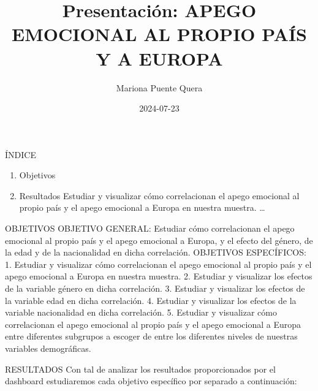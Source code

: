 \documentclass[
  ignorenonframetext,
]{beamer}
\title{Presentación: APEGO EMOCIONAL AL PROPIO PAÍS Y A EUROPA}
\author{Mariona Puente Quera}
\date{2024-07-23}
\providecommand{\tightlist}{%
  \setlength{\itemsep}{0pt}\setlength{\parskip}{0pt}}
\begin{document}
\frame{\titlepage}

\begin{frame}{ÍNDICE}
\label{uxedndice}
\begin{enumerate}
\tightlist
\item
  Objetivos
\item
  Resultados Estudiar y visualizar cómo correlacionan el apego emocional
  al propio país y el apego emocional a Europa en nuestra muestra.
  \ldots{}
\end{enumerate}
\end{frame}

\begin{frame}{OBJETIVOS}
\label{objetivos}
OBJETIVO GENERAL: Estudiar cómo correlacionan el apego emocional al
propio país y el apego emocional a Europa, y el efecto del género, de la
edad y de la nacionalidad en dicha correlación. OBJETIVOS ESPECÍFICOS:
1. Estudiar y visualizar cómo correlacionan el apego emocional al propio
país y el apego emocional a Europa en nuestra muestra. 2. Estudiar y
visualizar los efectos de la variable género en dicha correlación. 3.
Estudiar y visualizar los efectos de la variable edad en dicha
correlación. 4. Estudiar y visualizar los efectos de la variable
nacionalidad en dicha correlación. 5. Estudiar y visualizar cómo
correlacionan el apego emocional al propio país y el apego emocional a
Europa entre diferentes subgrupos a escoger de entre los diferentes
niveles de nuestras variables demográficas.
\end{frame}

\begin{frame}{RESULTADOS}
\label{resultados}
Con tal de analizar los resultados proporcionados por el dashboard
estudiaremos cada objetivo específico por separado a continuación:
\end{frame}
\end{document}
